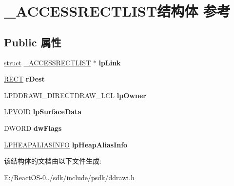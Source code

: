 \hypertarget{struct___a_c_c_e_s_s_r_e_c_t_l_i_s_t}{}\section{\+\_\+\+A\+C\+C\+E\+S\+S\+R\+E\+C\+T\+L\+I\+S\+T结构体 参考}
\label{struct___a_c_c_e_s_s_r_e_c_t_l_i_s_t}
\subsection*{Public 属性}
\begin{DoxyCompactItemize}
\item 
\mbox{\label{struct___a_c_c_e_s_s_r_e_c_t_l_i_s_t_a25496a6da299e7c21c4d87f36b25331b}} 
\hyperlink{interfacestruct}{struct} \hyperlink{struct___a_c_c_e_s_s_r_e_c_t_l_i_s_t}{\+\_\+\+A\+C\+C\+E\+S\+S\+R\+E\+C\+T\+L\+I\+ST} $\ast$ {\bfseries lp\+Link}
\item 
\mbox{\label{struct___a_c_c_e_s_s_r_e_c_t_l_i_s_t_a096dbabdc38699c94907b91f6a65e243}} 
\hyperlink{structtag_r_e_c_t}{R\+E\+CT} {\bfseries r\+Dest}
\item 
\mbox{\label{struct___a_c_c_e_s_s_r_e_c_t_l_i_s_t_a9a60daa6104c0828e1f0079592140926}} 
L\+P\+D\+D\+R\+A\+W\+I\+\_\+\+D\+I\+R\+E\+C\+T\+D\+R\+A\+W\+\_\+\+L\+CL {\bfseries lp\+Owner}
\item 
\mbox{\label{struct___a_c_c_e_s_s_r_e_c_t_l_i_s_t_ae031a980a93a2a62b460bd0a4a6da4a8}} 
\hyperlink{interfacevoid}{L\+P\+V\+O\+ID} {\bfseries lp\+Surface\+Data}
\item 
\mbox{\label{struct___a_c_c_e_s_s_r_e_c_t_l_i_s_t_a68913c1c57a7977e1b0694460237d5cd}} 
D\+W\+O\+RD {\bfseries dw\+Flags}
\item 
\mbox{\label{struct___a_c_c_e_s_s_r_e_c_t_l_i_s_t_a9aa422287e86fb481054952bb43679e2}} 
\hyperlink{struct___h_e_a_p_a_l_i_a_s_i_n_f_o}{L\+P\+H\+E\+A\+P\+A\+L\+I\+A\+S\+I\+N\+FO} {\bfseries lp\+Heap\+Alias\+Info}
\end{DoxyCompactItemize}


该结构体的文档由以下文件生成\+:\begin{DoxyCompactItemize}
\item 
E\+:/\+React\+O\+S-\/0../sdk/include/psdk/ddrawi.\+h\end{DoxyCompactItemize}
